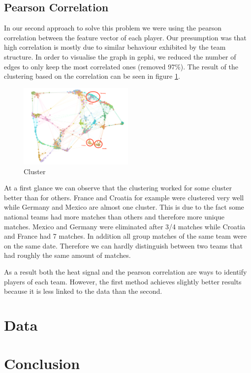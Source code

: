 \documentclass[12pt,a4paper, twocolumn]{article}
\begin{document}
\subsection{Pearson Correlation}
In our second approach to solve this problem we were using the pearson correlation between the feature vector of each player. Our presumption was that high correlation is mostly due to similar behaviour exhibited by the team structure. In order to visualise the graph in gephi, we reduced the number of edges to only keep the most correlated ones (removed 97\%). The result of the clustering based on the correlation can be seen in figure \ref{fig:cluster_gephi}. 

\begin{figure}[h!]
	\centering
	\includegraphics[width=0.5\textwidth]{ClusterGephi.png}
	\caption{Cluster}
	\label{fig:cluster_gephi}
\end{figure}

At a first glance we can observe that the clustering worked for some cluster better than for others. France and Croatia for example were clustered very well while Germany and Mexico are almost one cluster. This is due to the fact some national teams had more matches than others and therefore more unique matches. Mexico and Germany were eliminated after 3/4 matches while Croatia and France had 7 matches. In addition all group matches of the same team were on the same date. Therefore we can hardly distinguish between two teams that had roughly the same amount of matches. 
\par 
As a result both the heat signal and the pearson correlation are ways to identify players of each team. However, the first method achieves slightly better results because it is less linked to the data than the second. 




\section{Data}






\section{Conclusion}





\end{document}
